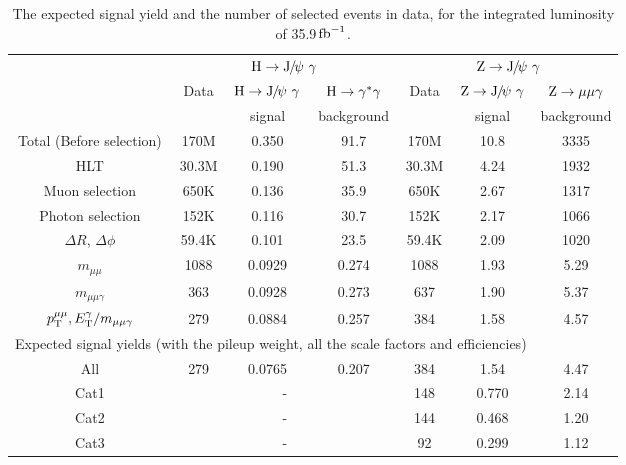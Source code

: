 \begin{table}[!ht]
	\scriptsize
	\begin{center}
	  \begin{tabular}{ccccccc}
	  \hline
	    & \multicolumn{3}{c}{$\mathrm{H}\rightarrow{\mathrm{J}\hspace{-.08em}/\hspace{-.14em}\psi}\ \gamma$}  & \multicolumn{3}{c}{$\mathrm{Z}\rightarrow{\mathrm{J}\hspace{-.08em}/\hspace{-.14em}\psi}\ \gamma$}\\
	    \cline{2-7}
	    & Data & $\mathrm{H}\rightarrow{\mathrm{J}\hspace{-.08em}/\hspace{-.14em}\psi}\ \gamma$ & $\mathrm{H}\rightarrow\gamma^{*}\gamma$ & Data &  $\mathrm{Z}\rightarrow{\mathrm{J}\hspace{-.08em}/\hspace{-.14em}\psi}\ \gamma$ & $\mathrm{Z}\to\mu\mu\gamma$\\
	    &      &  signal                    &  background                    &      & signal & background\\
	    \hline
	    Total (Before selection)& 170M & 0.350 & 91.7 & 170M & 10.8 & 3335\\
	    HLT & 30.3M & 0.190 & 51.3 & 30.3M & 4.24 & 1932\\
	    Muon selection & 650K & 0.136 & 35.9 & 650K & 2.67 & 1317\\
	    Photon selection & 152K & 0.116 & 30.7 & 152K & 2.17 & 1066 \\
	    $\Delta R$, $\Delta\phi$ & 59.4K & 0.101 & 23.5 & 59.4K & 2.09 & 1020\\
	    $m_{\mu\mu}$ & 1088 & 0.0929 & 0.274 & 1088 & 1.93 & 5.29\\
	    $m_{\mu\mu\gamma}$& 363 & 0.0928 & 0.273 & 637 & 1.90 & 5.37 \\
	    $p_{\mathrm{T}}^{\mu\mu},E_{\mathrm{T}}^{\gamma}/m_{\mu\mu\gamma}$ & 279 & 0.0884 & 0.257 & 384 & 1.58 & 4.57 \\
	    \hline
	    \multicolumn{6}{c}{Expected signal yields (with the pileup weight, all the scale factors and efficiencies)}\\
	    \hline
	    All & 279 & 0.0765 & 0.207 & 384 & 1.54 & 4.47\\
	    Cat1 & \multicolumn{3}{c}{-} & 148 & 0.770 & 2.14\\
	    Cat2 & \multicolumn{3}{c}{-} & 144 & 0.468 & 1.20\\
	    Cat3 & \multicolumn{3}{c}{-} & 92 & 0.299 & 1.12\\
	    \hline
	  \end{tabular}
	    \caption{The expected signal yield and the number of selected events in data, for the integrated luminosity of 35.9$\mbox{\ensuremath{\,\text{fb}^\text{$-$1}}}$.\label{tab:Cutflow}}
	\end{center}
	\end{table}
	
